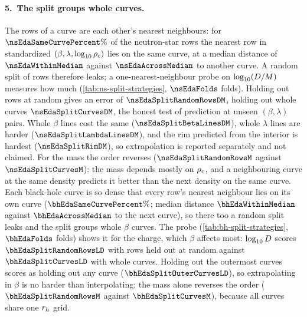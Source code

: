 \paragraph{5.\ The split groups whole curves.}
The rows of a curve are each other's nearest neighbours: for $\nsEdaSameCurvePercent\%$ of the neutron-star rows the nearest row in standardized $(\beta, \lambda, \log_{10}\rho_c)$ lies on the same curve, at a median distance of $\nsEdaWithinMedian$ against $\nsEdaAcrossMedian$ to another curve. A random split of rows therefore leaks; a one-nearest-neighbour probe on $\log_{10}(D/M)$ measures how much (\cref{tab:ns-split-strategies}, $\nsEdaFolds$ folds). Holding out rows at random gives an error of $\nsEdaSplitRandomRowsDM$, holding out whole curves $\nsEdaSplitCurvesDM$, the honest test of prediction at unseen $(\beta, \lambda)$ pairs. Whole $\beta$ lines cost the same ($\nsEdaSplitBetaLinesDM$), whole $\lambda$ lines are harder ($\nsEdaSplitLambdaLinesDM$), and the rim predicted from the interior is hardest ($\nsEdaSplitRimDM$), so extrapolation is reported separately and not claimed. For the mass the order reverses ($\nsEdaSplitRandomRowsM$ against $\nsEdaSplitCurvesM$): the mass depends mostly on $\rho_c$, and a neighbouring curve at the same density predicts it better than the next density on the same curve.
Each black-hole curve is so dense that every row's nearest neighbour lies on its own curve ($\bhEdaSameCurvePercent\%$; median distance $\bhEdaWithinMedian$ against $\bhEdaAcrossMedian$ to the next curve), so there too a random split leaks and the split groups whole $\beta$ curves. The probe (\cref{tab:bh-split-strategies}, $\bhEdaFolds$ folds) shows it for the charge, which $\beta$ affects most: $\log_{10}D$ scores $\bhEdaSplitRandomRowsLD$ with rows held out at random against $\bhEdaSplitCurvesLD$ with whole curves. Holding out the outermost curves scores as holding out any curve ($\bhEdaSplitOuterCurvesLD$), so extrapolating in $\beta$ is no harder than interpolating; the mass alone reverses the order ($\bhEdaSplitRandomRowsM$ against $\bhEdaSplitCurvesM$), because all curves share one $r_h$ grid.

\FloatBarrier


